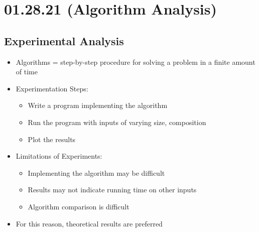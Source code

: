 \documentclass[11pt]{article}
\author{Sudhan Chitgopkar}
\date{\today}
\title{}
\begin{document}
\tableofcontents \clearpage\section{01.28.21 (Algorithm Analysis)}
\label{sec:org2a06abb}
\subsection{Experimental Analysis}
\label{sec:org11b6a1d}
\begin{itemize}
\item Algorithms = step-by-step procedure for solving a problem in a finite amount of time
\item Experimentation Steps:
\begin{itemize}
\item Write a program implementing the algorithm
\item Run the program with inputs of varying size, composition
\item Plot the results
\end{itemize}
\item Limitations of Experiments:
\begin{itemize}
\item Implementing the algorithm may be difficult
\item Results may not indicate running time on other inputs
\item Algorithm comparison is difficult
\end{itemize}
\item For this reason, theoretical results are preferred
\end{itemize}
\end{document}
